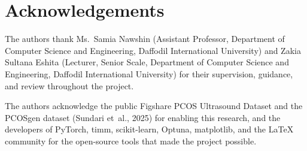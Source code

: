 \chapter*{Acknowledgements}

The authors thank Ms.\ Samia Nawshin (Assistant Professor, Department of
Computer Science and Engineering, Daffodil International University) and
Zakia Sultana Eshita (Lecturer, Senior Scale, Department of Computer Science
and Engineering, Daffodil International University) for their supervision,
guidance, and review throughout the project.

The authors acknowledge the public Figshare PCOS Ultrasound Dataset and the
PCOSgen dataset (Sundari et~al., 2025) for enabling this research, and the
developers of PyTorch, timm, scikit-learn, Optuna, matplotlib, and the
LaTeX community for the open-source tools that made the project possible.
